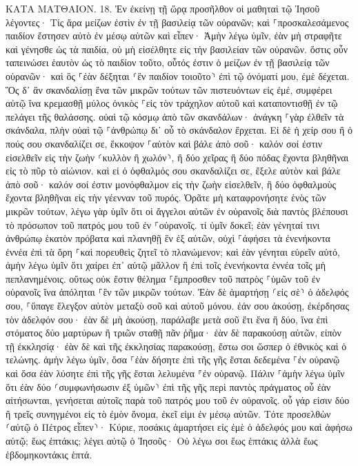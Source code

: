 \documentclass[twoside, 9pt]{extreport}
\begin{document}
ΚΑΤΑ ΜΑΤΘΑΙΟΝ.
18.
Ἐν ἐκείνῃ τῇ ὥρᾳ προσῆλθον οἱ μαθηταὶ τῷ Ἰησοῦ λέγοντες· Τίς ἄρα μείζων ἐστὶν ἐν τῇ βασιλείᾳ τῶν οὐρανῶν; 
καὶ ⸀προσκαλεσάμενος παιδίον ἔστησεν αὐτὸ ἐν μέσῳ αὐτῶν 
καὶ εἶπεν· Ἀμὴν λέγω ὑμῖν, ἐὰν μὴ στραφῆτε καὶ γένησθε ὡς τὰ παιδία, οὐ μὴ εἰσέλθητε εἰς τὴν βασιλείαν τῶν οὐρανῶν. 
ὅστις οὖν ταπεινώσει ἑαυτὸν ὡς τὸ παιδίον τοῦτο, οὗτός ἐστιν ὁ μείζων ἐν τῇ βασιλείᾳ τῶν οὐρανῶν· 
καὶ ὃς ⸀ἐὰν δέξηται ⸂ἓν παιδίον τοιοῦτο⸃ ἐπὶ τῷ ὀνόματί μου, ἐμὲ δέχεται. 
Ὃς δ᾽ ἂν σκανδαλίσῃ ἕνα τῶν μικρῶν τούτων τῶν πιστευόντων εἰς ἐμέ, συμφέρει αὐτῷ ἵνα κρεμασθῇ μύλος ὀνικὸς ⸀εἰς τὸν τράχηλον αὐτοῦ καὶ καταποντισθῇ ἐν τῷ πελάγει τῆς θαλάσσης. 
οὐαὶ τῷ κόσμῳ ἀπὸ τῶν σκανδάλων· ἀνάγκη ⸀γὰρ ἐλθεῖν τὰ σκάνδαλα, πλὴν οὐαὶ τῷ ⸀ἀνθρώπῳ δι᾽ οὗ τὸ σκάνδαλον ἔρχεται. 
Εἰ δὲ ἡ χείρ σου ἢ ὁ πούς σου σκανδαλίζει σε, ἔκκοψον ⸀αὐτὸν καὶ βάλε ἀπὸ σοῦ· καλόν σοί ἐστιν εἰσελθεῖν εἰς τὴν ζωὴν ⸂κυλλὸν ἢ χωλόν⸃, ἢ δύο χεῖρας ἢ δύο πόδας ἔχοντα βληθῆναι εἰς τὸ πῦρ τὸ αἰώνιον. 
καὶ εἰ ὁ ὀφθαλμός σου σκανδαλίζει σε, ἔξελε αὐτὸν καὶ βάλε ἀπὸ σοῦ· καλόν σοί ἐστιν μονόφθαλμον εἰς τὴν ζωὴν εἰσελθεῖν, ἢ δύο ὀφθαλμοὺς ἔχοντα βληθῆναι εἰς τὴν γέενναν τοῦ πυρός. 
Ὁρᾶτε μὴ καταφρονήσητε ἑνὸς τῶν μικρῶν τούτων, λέγω γὰρ ὑμῖν ὅτι οἱ ἄγγελοι αὐτῶν ἐν οὐρανοῖς διὰ παντὸς βλέπουσι τὸ πρόσωπον τοῦ πατρός μου τοῦ ἐν ⸀οὐρανοῖς. 
τί ὑμῖν δοκεῖ; ἐὰν γένηταί τινι ἀνθρώπῳ ἑκατὸν πρόβατα καὶ πλανηθῇ ἓν ἐξ αὐτῶν, οὐχὶ ⸀ἀφήσει τὰ ἐνενήκοντα ἐννέα ἐπὶ τὰ ὄρη ⸀καὶ πορευθεὶς ζητεῖ τὸ πλανώμενον; 
καὶ ἐὰν γένηται εὑρεῖν αὐτό, ἀμὴν λέγω ὑμῖν ὅτι χαίρει ἐπ᾽ αὐτῷ μᾶλλον ἢ ἐπὶ τοῖς ἐνενήκοντα ἐννέα τοῖς μὴ πεπλανημένοις. 
οὕτως οὐκ ἔστιν θέλημα ⸀ἔμπροσθεν τοῦ πατρὸς ⸀ὑμῶν τοῦ ἐν οὐρανοῖς ἵνα ἀπόληται ⸀ἓν τῶν μικρῶν τούτων. 
Ἐὰν δὲ ἁμαρτήσῃ ⸂εἰς σὲ⸃ ὁ ἀδελφός σου, ⸀ὕπαγε ἔλεγξον αὐτὸν μεταξὺ σοῦ καὶ αὐτοῦ μόνου. ἐάν σου ἀκούσῃ, ἐκέρδησας τὸν ἀδελφόν σου· 
ἐὰν δὲ μὴ ἀκούσῃ, παράλαβε μετὰ σοῦ ἔτι ἕνα ἢ δύο, ἵνα ἐπὶ στόματος δύο μαρτύρων ἢ τριῶν σταθῇ πᾶν ῥῆμα· 
ἐὰν δὲ παρακούσῃ αὐτῶν, εἰπὸν τῇ ἐκκλησίᾳ· ἐὰν δὲ καὶ τῆς ἐκκλησίας παρακούσῃ, ἔστω σοι ὥσπερ ὁ ἐθνικὸς καὶ ὁ τελώνης. 
ἀμὴν λέγω ὑμῖν, ὅσα ⸀ἐὰν δήσητε ἐπὶ τῆς γῆς ἔσται δεδεμένα ⸀ἐν οὐρανῷ καὶ ὅσα ἐὰν λύσητε ἐπὶ τῆς γῆς ἔσται λελυμένα ⸁ἐν οὐρανῷ. 
Πάλιν ⸀ἀμὴν λέγω ὑμῖν ὅτι ἐὰν δύο ⸂συμφωνήσωσιν ἐξ ὑμῶν⸃ ἐπὶ τῆς γῆς περὶ παντὸς πράγματος οὗ ἐὰν αἰτήσωνται, γενήσεται αὐτοῖς παρὰ τοῦ πατρός μου τοῦ ἐν οὐρανοῖς. 
οὗ γάρ εἰσιν δύο ἢ τρεῖς συνηγμένοι εἰς τὸ ἐμὸν ὄνομα, ἐκεῖ εἰμι ἐν μέσῳ αὐτῶν. 
Τότε προσελθὼν ⸂αὐτῷ ὁ Πέτρος εἶπεν⸃· Κύριε, ποσάκις ἁμαρτήσει εἰς ἐμὲ ὁ ἀδελφός μου καὶ ἀφήσω αὐτῷ; ἕως ἑπτάκις; 
λέγει αὐτῷ ὁ Ἰησοῦς· Οὐ λέγω σοι ἕως ἑπτάκις ἀλλὰ ἕως ἑβδομηκοντάκις ἑπτά. 
\end{document}
